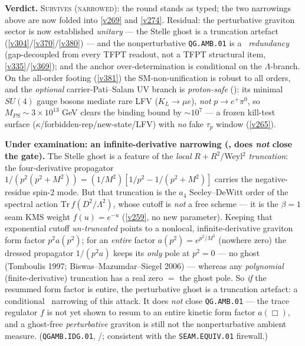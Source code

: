 \noindent\textbf{Verdict.} \textsc{Survives (narrowed)}: the round stands as typed; the two narrowings above are
now folded into \vref{v269} and \vref{v274}. Residual: the perturbative graviton sector is now established
\emph{unitary} --- the Stelle ghost is a truncation artefact (\vref{v304}/\vref{v370}/\vref{v380}) --- and the
nonperturbative \texttt{QG.AMB.01} is a \mC\ \emph{redundancy} (gap-decoupled from every TFPT readout, not a TFPT
structural item, \vref{v335}/\vref{v369}); and the anchor over-determination is conditional on the $\Lambda$-branch.
On the all-order footing (\vref{v381}) the SM-non-unification is robust to all orders, and the \emph{optional}
carrier-Pati--Salam UV branch is \emph{proton-safe} (): its minimal $SU(4)$ gauge bosons mediate rare
LFV ($K_L\to\mu e$), \emph{not} $p\to e^+\pi^0$, so $M_{PS}\sim3\times10^{13}$ GeV clears the binding bound by
$\sim10^7$ --- a frozen kill-test surface ($\kappa$/forbidden-rep/new-state/LFV) with \emph{no} fake $\tau_p$
window (\vref{v265}).

\par\smallskip\noindent\textbf{Under examination: an infinite-derivative narrowing (\mC, does \emph{not}
close the gate).} The Stelle ghost is a feature of the \emph{local} $R{+}R^2/$Weyl$^2$ \emph{truncation}:
the four-derivative propagator $1/(p^2(p^2{+}M^2))=(1/M^2)[1/p^2-1/(p^2{+}M^2)]$ carries the
negative-residue spin-2 mode. But that truncation is the $a_4$ Seeley--DeWitt order of the spectral action
$\mathrm{Tr}\,f(D^2/\Lambda^2)$, whose cutoff is \emph{not} a free scheme --- it is the $\beta{=}1$ seam KMS
weight $f(u)=e^{-u}$ (\vref{v259}, no new parameter). Keeping that exponential cutoff \emph{un-truncated}
points to a nonlocal, infinite-derivative graviton form factor $p^2 a(p^2)$; for an \emph{entire} factor
$a(p^2)=e^{p^2/M^2}$ (nowhere zero) the dressed propagator $1/(p^2 a)$ keeps its \emph{only} pole at $p^2{=}0$
--- no ghost (Tomboulis 1997; Biswas--Mazumdar--Siegel 2006) --- whereas any \emph{polynomial}
(finite-derivative) truncation has a real zero $=$ the ghost pole. So \emph{if} the resummed form factor is
entire, the perturbative ghost is a truncation artefact: a conditional \mC\ narrowing of this attack. It does
\emph{not} close \texttt{QG.AMB.01} --- the trace regulator $f$ is not yet shown to resum to an entire kinetic
form factor $a(\Box)$, and a ghost-free \emph{perturbative} graviton is still not the nonperturbative ambient
measure. (\texttt{QGAMB.IDG.01}, \mC/\mO; consistent with the \texttt{SEAM.EQUIV.01} firewall.)

